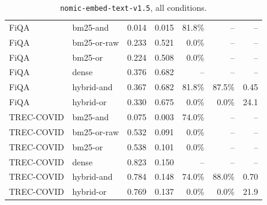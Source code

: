 \documentclass[11pt]{article}
\begin{document}
\begin{table}[p]
\begin{tabular}{llrrrrr}
\midrule
FiQA & bm25-and & 0.014 & 0.015 & 81.8\% & -- & -- \\
FiQA & bm25-or-raw & 0.233 & 0.521 & 0.0\% & -- & -- \\
FiQA & bm25-or & 0.224 & 0.508 & 0.0\% & -- & -- \\
FiQA & dense & 0.376 & 0.682 & -- & -- & -- \\
FiQA & hybrid-and & 0.367 & 0.682 & 81.8\% & 87.5\% & 0.45 \\
FiQA & hybrid-or & 0.330 & 0.675 & 0.0\% & 0.0\% & 24.1 \\
\midrule
TREC-COVID & bm25-and & 0.075 & 0.003 & 74.0\% & -- & -- \\
TREC-COVID & bm25-or-raw & 0.532 & 0.091 & 0.0\% & -- & -- \\
TREC-COVID & bm25-or & 0.538 & 0.101 & 0.0\% & -- & -- \\
TREC-COVID & dense & 0.823 & 0.150 & -- & -- & -- \\
TREC-COVID & hybrid-and & 0.784 & 0.148 & 74.0\% & 88.0\% & 0.70 \\
TREC-COVID & hybrid-or & 0.769 & 0.137 & 0.0\% & 0.0\% & 21.9 \\
\bottomrule
\end{tabular}
\caption{\texttt{nomic-embed-text-v1.5}, all conditions.}
\label{tab:full-nomic}
\end{table}
\end{document}
